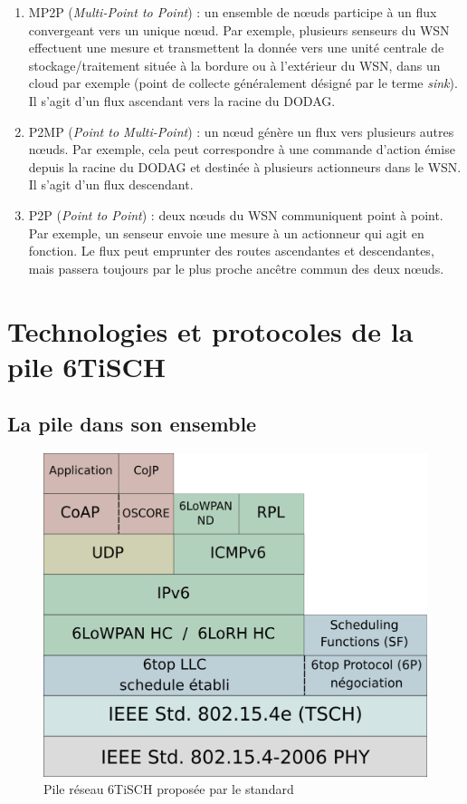 \documentclass[]{report}
\begin{document}
\begin{enumerate}
\item MP2P (\textit{Multi-Point to Point}) : un ensemble de nœuds participe à un flux convergeant vers un unique nœud. Par exemple, plusieurs senseurs du WSN effectuent une mesure et transmettent la donnée vers une unité centrale de stockage/traitement située à la bordure ou à l'extérieur du WSN, dans un cloud par exemple (point de collecte généralement désigné par le terme \textit{sink}). Il s'agit d'un flux ascendant vers la racine du DODAG.
\vspace{0.2cm}
\item P2MP (\textit{Point to Multi-Point}) : un nœud génère un flux vers plusieurs autres nœuds. Par exemple, cela peut correspondre à une commande d'action émise depuis la racine du DODAG et destinée à plusieurs actionneurs dans le WSN. Il s'agit d'un flux descendant.
\vspace{0.2cm}
\item P2P (\textit{Point to Point}) : deux nœuds du WSN communiquent point à point. Par exemple, un senseur envoie une mesure à un actionneur qui agit en fonction. Le flux peut emprunter des routes ascendantes et descendantes, mais passera toujours par le plus proche ancêtre commun des deux nœuds.
\end{enumerate}

\newpage

\section{Technologies et protocoles de la pile 6TiSCH}
	\subsection{La pile dans son ensemble}
	\label{6TiSCH_stack}
	
	\begin{figure}[!ht]
	\centering
	\includegraphics[width=0.55\linewidth]{6TiSCH_stack}
	\caption{Pile réseau 6TiSCH proposée par le standard \cite{ietf-6tisch-architecture-28}}
	\label{fig:6TiSCH_stack}
	\end{figure}
\end{document}
